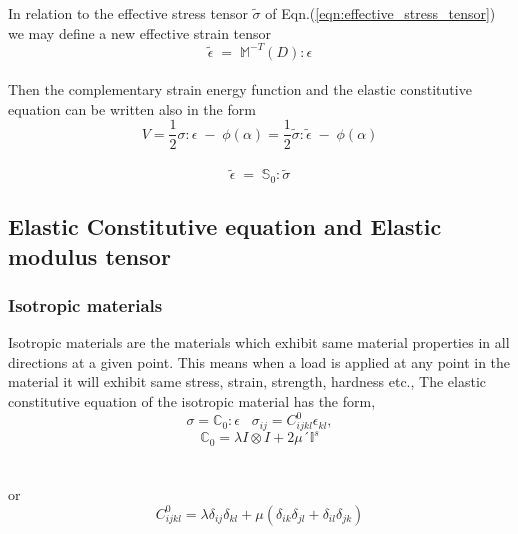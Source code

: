 \documentclass[a4paper,12pt]{article}
\begin{document}
In relation to the effective stress tensor $\tilde{\sigma}$ of Eqn.(\ref{eqn:effective_stress_tensor}) we may define a new effective strain tensor
\\
\begin{equation}
\tilde{\epsilon} \; = \; \mathbb{M}^{-T}(D) : \epsilon
\end{equation}
\\
Then the complementary strain energy function and the elastic constitutive equation can be written also in the form
\\
\begin{equation}
V = \frac{1}{2}\sigma : \epsilon \; - \; \phi(\alpha) = \frac{1}{2}\tilde{\sigma} : \tilde{\epsilon} \; - \; \phi(\alpha)
\end{equation}
\\
\begin{equation}
\tilde{\epsilon} \; = \; \mathbb{S}_{0} : \tilde{\sigma}
\end{equation}
\newpage 
\subsection{Elastic Constitutive equation and Elastic modulus tensor}
\subsubsection{Isotropic materials}
\indent\indent\indent Isotropic materials are the materials which exhibit same material properties in all directions at a given point. This means when a load is applied at any point in the material it will exhibit same stress, strain, strength, hardness etc., The elastic constitutive equation of the isotropic material has the form, 
\begin{equation}
  \sigma = \mathbb{C}_{0} : \epsilon   \;\;\;  \sigma_{ij}  =  C^{0}_{ijkl}\epsilon_{kl},
\end{equation}
\begin{equation}
\mathbb{C}_{0} =  \lambda I \otimes I  +  2\mu ´\mathbb{I}^{s}
\end{equation}\\
\\
or
\begin{equation}
C^{0}_{ijkl} = \lambda\delta_{ij}\delta_{kl}  +  \mu(\delta_{ik}\delta_{jl}+\delta_{il}\delta_{jk})
\end{equation}
\end{document}
